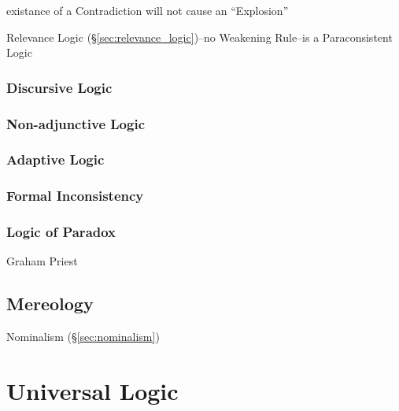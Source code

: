 existance of a Contradiction will not cause an ``Explosion''

Relevance Logic (\S\ref{sec:relevance_logic})--no Weakening Rule--is a
Paraconsistent Logic



\subsubsection{Discursive Logic}\label{sec:discursive_logic}

\subsubsection{Non-adjunctive Logic}\label{sec:nonadjunctive_logic}

\subsubsection{Adaptive Logic}\label{sec:adaptive_logic}

\subsubsection{Formal Inconsistency}\label{sec:formal_inconsistency}

\subsubsection{Logic of Paradox}\label{sec:logic_of_paradox}

Graham Priest



\subsection{Mereology}\label{sec:mereology}

Nominalism (\S\ref{sec:nominalism})



\section{Universal Logic}\label{sec:universal_logic}

